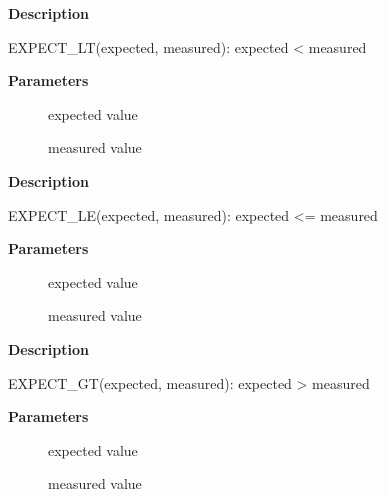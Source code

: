 \documentclass[a4paper,8pt,english]{sphinxmanual}
\begin{document}
\textbf{Description}

EXPECT\_LT(expected, measured): expected \textless{} measured

\begin{fulllineitems}
\label{dev-tools/kselftest:c.EXPECT_LE}
\end{fulllineitems}


\textbf{Parameters}
\begin{description}
\item[{}] \leavevmode
expected value

\item[{}] \leavevmode
measured value

\end{description}

\textbf{Description}

EXPECT\_LE(expected, measured): expected \textless{}= measured

\begin{fulllineitems}
\label{dev-tools/kselftest:c.EXPECT_GT}
\end{fulllineitems}


\textbf{Parameters}
\begin{description}
\item[{}] \leavevmode
expected value

\item[{}] \leavevmode
measured value

\end{description}

\textbf{Description}

EXPECT\_GT(expected, measured): expected \textgreater{} measured

\begin{fulllineitems}
\label{dev-tools/kselftest:c.EXPECT_GE}
\end{fulllineitems}


\textbf{Parameters}
\begin{description}
\item[{}] \leavevmode
expected value

\item[{}] \leavevmode
measured value

\end{description}
\end{document}
